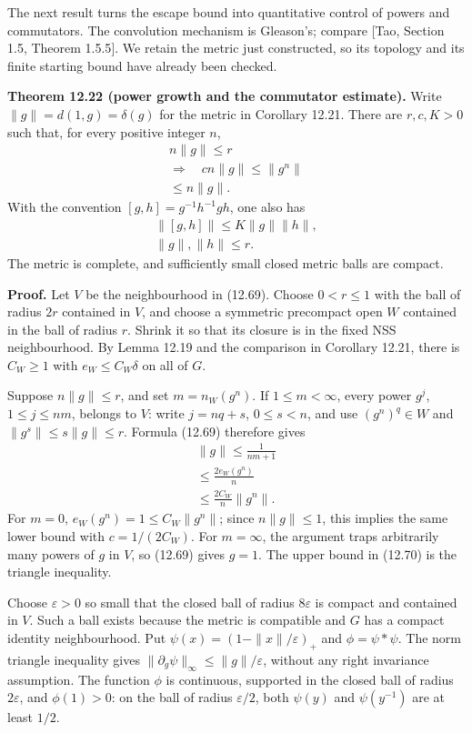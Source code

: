 \documentclass[
  11pt,
]{article}
\begin{document}
The next result turns the escape bound into quantitative control of
powers and commutators. The convolution mechanism is Gleason's; compare
{[}Tao, Section 1.5, Theorem 1.5.5{]}. We retain the metric just
constructed, so its topology and its finite starting bound have already
been checked.

\textbf{Theorem 12.22 (power growth and the commutator estimate).} Write
\(\|g\|=d(1,g)=\delta(g)\) for the metric in Corollary 12.21. There are
\(r,c,K>0\) such that, for every positive integer \(n\), \[
\begin{gathered}
n\|g\|\leq r\\
\Longrightarrow\quad cn\|g\|\leq\|g^n\|\\
\leq n\|g\|.
\end{gathered}
\tag{12.70}
\] With the convention \([g,h]=g^{-1}h^{-1}gh\), one also has \[
\begin{gathered}
\|[g,h]\|\leq K\|g\|\|h\|,\\
\|g\|,\|h\|\leq r.
\end{gathered}
\tag{12.71}
\] The metric is complete, and sufficiently small closed metric balls
are compact.

\textbf{Proof.} Let \(V\) be the neighbourhood in (12.69). Choose
\(0<r\leq1\) with the ball of radius \(2r\) contained in \(V\), and
choose a symmetric precompact open \(W\) contained in the ball of radius
\(r\). Shrink it so that its closure is in the fixed NSS neighbourhood.
By Lemma 12.19 and the comparison in Corollary 12.21, there is
\(C_W\geq1\) with \(e_W\leq C_W\delta\) on all of \(G\).

Suppose \(n\|g\|\leq r\), and set \(m=n_W(g^n)\). If \(1\leq m<\infty\),
every power \(g^j\), \(1\leq j\leq nm\), belongs to \(V\): write
\(j=nq+s\), \(0\leq s<n\), and use \((g^n)^q\in W\) and
\(\|g^s\|\leq s\|g\|\leq r\). Formula (12.69) therefore gives \[
\begin{gathered}
\|g\|\leq\frac1{nm+1}\\
\leq\frac{2e_W(g^n)}n\\
\leq\frac{2C_W}n\|g^n\|.
\end{gathered}
\tag{12.72}
\] For \(m=0\), \(e_W(g^n)=1\leq C_W\|g^n\|\); since \(n\|g\|\leq1\),
this implies the same lower bound with \(c=1/(2C_W)\). For \(m=\infty\),
the argument traps arbitrarily many powers of \(g\) in \(V\), so (12.69)
gives \(g=1\). The upper bound in (12.70) is the triangle inequality.

Choose \(\varepsilon>0\) so small that the closed ball of radius
\(8\varepsilon\) is compact and contained in \(V\). Such a ball exists
because the metric is compatible and \(G\) has a compact identity
neighbourhood. Put \(\psi(x)=(1-\|x\|/\varepsilon)_+\) and
\(\phi=\psi*\psi\). The norm triangle inequality gives
\(\|\partial_g\psi\|_\infty\leq\|g\|/\varepsilon\), without any right
invariance assumption. The function \(\phi\) is continuous, supported in
the closed ball of radius \(2\varepsilon\), and \(\phi(1)>0\): on the
ball of radius \(\varepsilon/2\), both \(\psi(y)\) and \(\psi(y^{-1})\)
are at least \(1/2\).
\end{document}
